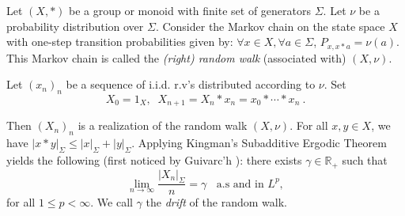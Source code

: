 \documentclass[11pt,a4paper]{article}
\theoremstyle{remark}
\begin{document}
Let $(X,\ast)$ be a group or monoid with finite set of generators
$\Sigma$. Let $\nu$ be a probability distribution over $\Sigma$.
Consider the Markov chain on the state space $X$ with one-step
transition probabilities given by: $\forall x \in X, \forall a \in
\Sigma$, $P_{x,x\ast a} = \nu(a)$. This Markov chain is called the
\textit{(right) random walk} (associated with) $(X,\nu)$.

Let $(x_{n})_n$ be a sequence of i.i.d. r.v's distributed
according to $\nu$. Set
\begin{equation}\label{7}
X_{0} = 1_{X}, \;\; \mbox{} X_{n+1} = X_{n}\ast x_{n}=x_{0}\ast
\cdots \ast x_{n} \:.
\end{equation}

Then $(X_n)_n$ is a realization of the random walk $(X,\nu)$. For
all $x, y \in X$, we have $|x\ast y |_{\Sigma} \leq
|x|_{\Sigma}+|y|_{\Sigma}$. Applying Kingman's Subadditive Ergodic
Theorem yields the following (first noticed by Guivarc'h
\cite{guiv80}): there exists $\gamma \in \mathbb{R}_{+}$ such that
\begin{equation}\label{eq-guiv}
\lim_{n \rightarrow \infty} \frac{|X_{n}|_{\Sigma}}{n} = \gamma
\;\; \mbox{ a.s and in $L^{p}$},
\end{equation}
for all $1\leq p <\infty$. We call $\gamma$ the {\em drift} of the
random walk.
\end{document}
